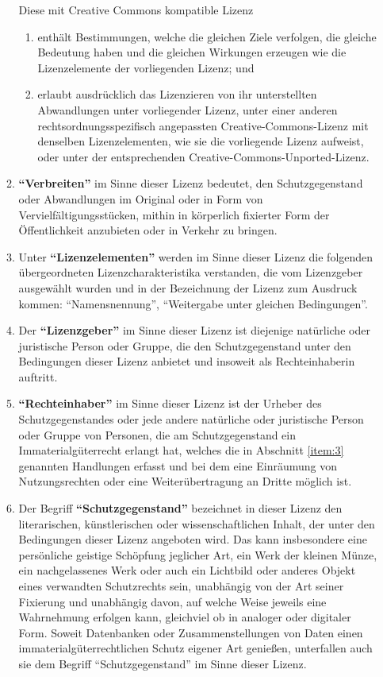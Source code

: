 \begin{enumerate}
\begin{enumerate}
Diese mit Creative Commons kompatible Lizenz
        \begin{enumerate}
          \item enthält Bestimmungen, welche die gleichen Ziele verfolgen, die gleiche Bedeutung haben und die gleichen Wirkungen erzeugen wie die Lizenzelemente der vorliegenden Lizenz; und
          \item erlaubt ausdrücklich das Lizenzieren von ihr unterstellten Abwandlungen unter vorliegender Lizenz, unter einer anderen rechtsordnungsspezifisch angepassten Creative-Commons-Lizenz mit denselben Lizenzelementen, wie sie die vorliegende Lizenz aufweist, oder unter der entsprechenden Creative-Commons-Unported-Lizenz.
        \end{enumerate}
      \item \textbf{``Verbreiten''} im Sinne dieser Lizenz bedeutet, den Schutzgegenstand oder Abwandlungen im Original oder in Form von Vervielfältigungsstücken, mithin in körperlich fixierter Form der Öffentlichkeit anzubieten oder in Verkehr zu bringen.
      \item Unter \textbf{``Lizenzelementen''} werden im Sinne dieser Lizenz die folgenden übergeordneten Lizenzcharakteristika verstanden, die vom Lizenzgeber ausgewählt wurden und in der Bezeichnung der Lizenz zum Ausdruck kommen: ``Namensnennung'', ``Weitergabe unter gleichen Bedingungen''.
      \item Der \textbf{``Lizenzgeber''} im Sinne dieser Lizenz ist diejenige natürliche oder juristische Person oder Gruppe, die den Schutzgegenstand unter den Bedingungen dieser Lizenz anbietet und insoweit als Rechteinhaberin auftritt.
      \item \textbf{``Rechteinhaber''} im Sinne dieser Lizenz ist der Urheber des Schutzgegenstandes oder jede andere natürliche oder juristische Person oder Gruppe von Personen, die am Schutzgegenstand ein Immaterialgüterrecht erlangt hat, welches die in Abschnitt \ref{item:3} genannten Handlungen erfasst und bei dem eine Einräumung von Nutzungsrechten oder eine Weiterübertragung an Dritte möglich ist.
      \item Der Begriff \textbf{``Schutzgegenstand''} bezeichnet in dieser Lizenz den literarischen, künstlerischen oder wissenschaftlichen Inhalt, der unter den Bedingungen dieser Lizenz angeboten wird. Das kann insbesondere eine persönliche geistige Schöpfung jeglicher Art, ein Werk der kleinen Münze, ein nachgelassenes Werk oder auch ein Lichtbild oder anderes Objekt eines verwandten Schutzrechts sein, unabhängig von der Art seiner Fixierung und unabhängig davon, auf welche Weise jeweils eine Wahrnehmung erfolgen kann, gleichviel ob in analoger oder digitaler Form. Soweit Datenbanken oder Zusammenstellungen von Daten einen immaterialgüterrechtlichen Schutz eigener Art genießen, unterfallen auch sie dem Begriff ``Schutzgegenstand'' im Sinne dieser Lizenz.

\end{enumerate}
\end{enumerate}
